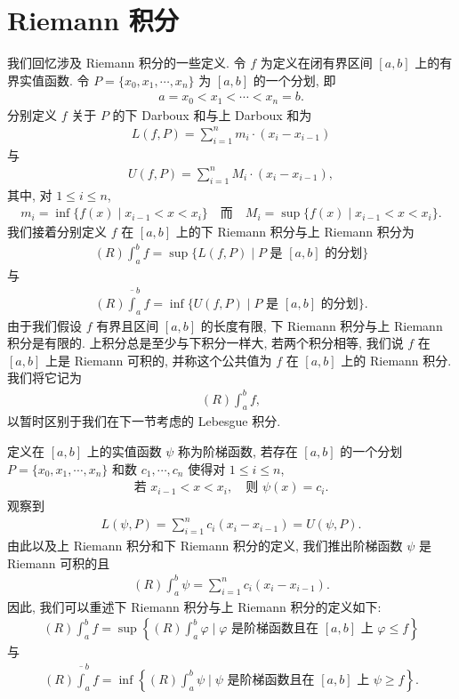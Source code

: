 \documentclass[../../main.tex]{subfiles}
\begin{document}
\section{Riemann 积分}\label{section:ch04-Riemann积分}

我们回忆涉及 Riemann 积分的一些定义. 令 $f$ 为定义在闭有界区间 $[a,b]$ 上的有界实值函数. 令 $P=\{x_{0},x_{1},\cdots,x_{n}\}$ 为 $[a,b]$ 的一个分划, 即
\begin{align*}
a=x_{0}<x_{1}<\cdots<x_{n}=b.
\end{align*}
分别定义 $f$ 关于 $P$ 的下 Darboux 和与上 Darboux 和为
\begin{align*}
L(f,P)=\sum_{i=1}^{n}m_{i}\cdot(x_{i}-x_{i-1})
\end{align*}
与
\begin{align*}
U(f,P)=\sum_{i=1}^{n}M_{i}\cdot(x_{i}-x_{i-1}),
\end{align*}
其中, 对 $1\leqslant i\leqslant n$,
\begin{align*}
m_{i}=\inf\{f(x)\mid x_{i-1}<x<x_{i}\}\quad\text{而}\quad M_{i}=\sup\{f(x)\mid x_{i-1}<x<x_{i}\}.
\end{align*}
我们接着分别定义 $f$ 在 $[a,b]$ 上的下 Riemann 积分与上 Riemann 积分为
\begin{align*}
(R)\int_{a}^{b}f=\sup\{L(f,P)\mid P\text{ 是 }[a,b]\text{ 的分划}\}
\end{align*}
与
\begin{align*}
(R)\overline{\int}_{a}^{b}f=\inf\{U(f,P)\mid P\text{ 是 }[a,b]\text{ 的分划}\}.
\end{align*}
由于我们假设 $f$ 有界且区间 $[a,b]$ 的长度有限, 下 Riemann 积分与上 Riemann 积分是有限的. 上积分总是至少与下积分一样大, 若两个积分相等, 我们说 $f$ 在 $[a,b]$ 上是 Riemann 可积的, 并称这个公共值为 $f$ 在 $[a,b]$ 上的 Riemann 积分. 我们将它记为
\begin{align*}
(R)\int_{a}^{b}f,
\end{align*}
以暂时区别于我们在下一节考虑的 Lebesgue 积分.

定义在 $[a,b]$ 上的实值函数 $\psi$ 称为阶梯函数, 若存在 $[a,b]$ 的一个分划 $P=\{x_{0},x_{1},\cdots,x_{n}\}$ 和数 $c_{1},\cdots,c_{n}$ 使得对 $1\leqslant i\leqslant n$,
\begin{align*}
\text{若 }x_{i-1}<x<x_{i},\quad\text{则 }\psi(x)=c_{i}.
\end{align*}
观察到
\begin{align*}
L(\psi,P)=\sum_{i=1}^{n}c_{i}(x_{i}-x_{i-1})=U(\psi,P).
\end{align*}
由此以及上 Riemann 积分和下 Riemann 积分的定义, 我们推出阶梯函数 $\psi$ 是 Riemann 可积的且
\begin{align*}
(R)\int_{a}^{b}\psi=\sum_{i=1}^{n}c_{i}(x_{i}-x_{i-1}).
\end{align*}
因此, 我们可以重述下 Riemann 积分与上 Riemann 积分的定义如下:
\begin{align*}
(R)\int_{a}^{b}f=\sup\left\{(R)\int_{a}^{b}\varphi\mid\varphi\text{ 是阶梯函数且在 }[a,b]\text{ 上 }\varphi\leqslant f\right\}
\end{align*}
与
\begin{align*}
(R)\overline{\int}_{a}^{b}f=\inf\left\{(R)\int_{a}^{b}\psi\mid\psi\text{ 是阶梯函数且在 }[a,b]\text{ 上 }\psi\geqslant f\right\}.
\end{align*}
\end{document}

